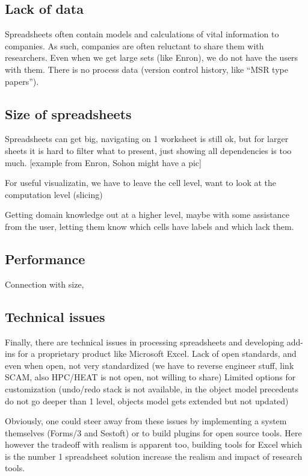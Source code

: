 \documentclass[conference]{IEEEtran}
\begin{document}
\subsection{Lack of data}
Spreadsheets often contain models and calculations of vital information to companies. As such, companies are often reluctant to share them with researchers.  Even when we get large sets (like Enron), we do not have the users with them. There is no process data (version control history, like “MSR type papers”).

\subsection{Size of spreadsheets }
Spreadsheets can get big, navigating on 1 worksheet is still ok, but for larger sheets it is hard to filter what to present, just showing all dependencies is too much. [example from Enron, Sohon might have a pic]

For useful visualizatin, we have to leave the cell level, want to look at the computation level (slicing)

Getting domain knowledge out at a higher level, maybe with some assistance from the user, letting them know which cells have labels and which lack them.

\subsection{Performance}
Connection with size, 

\subsection{Technical issues}
Finally, there are technical issues in processing spreadsheets and developing add-ins for a proprietary product like Microsoft Excel. 
Lack of open standards, and even when open, not very standardized (we have to reverse engineer stuff, link SCAM, also HPC/HEAT is not open, not willing to share)
Limited options for customization (undo/redo stack is not available, in the object model precedents do not go deeper than 1 level, objects model gets extended but not updated)

Obviously, one could steer away from these issues by implementing a system themselves (Forms/3 and Sestoft) or to build plugins for open source tools. Here however the tradeoff with realism is apparent too, building tools for Excel which is the number 1 spreadsheet solution increase the realism and impact of research tools.
\end{document}
